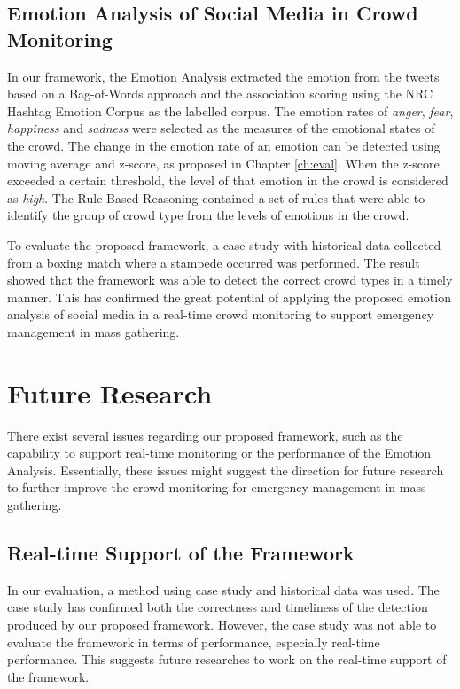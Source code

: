 \subsection{Emotion Analysis of Social Media in Crowd Monitoring}
In our framework, the Emotion Analysis extracted the emotion from the tweets based on a Bag-of-Words approach and the association scoring using the NRC Hashtag Emotion Corpus \parencite{mohammad2014using} as the labelled corpus. The emotion rates of \textit{anger}, \textit{fear}, \textit{happiness} and \textit{sadness} were selected as the measures of the emotional states of the crowd. The change in the emotion rate of an emotion can be detected using moving average and z-score, as proposed in Chapter \ref{ch:eval}. When the z-score exceeded a certain threshold, the level of that emotion in the crowd is considered as \textit{high}. The Rule Based Reasoning contained a set of rules that were able to identify the group of crowd type from the levels of emotions in the crowd. 

To evaluate the proposed framework, a case study with historical data collected from a boxing match where a stampede occurred was performed. The result showed that the framework was able to detect the correct crowd types in a timely manner. This has confirmed the great potential of applying the proposed emotion analysis of social media in a real-time crowd monitoring to support emergency management in mass gathering.

\section{Future Research}
There exist several issues regarding our proposed framework, such as the capability to support real-time monitoring or the performance of the Emotion Analysis. Essentially, these issues might suggest the direction for future research to further improve the crowd monitoring for emergency management in mass gathering.

\subsection{Real-time Support of the Framework}
In our evaluation, a method using case study and historical data was used. The case study has confirmed both the correctness and timeliness of the detection produced by our proposed framework. However, the case study was not able to evaluate the framework in terms of performance, especially real-time performance. This suggests future researches to work on the real-time support of the framework.


